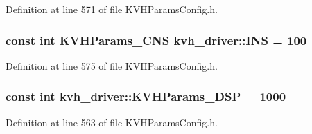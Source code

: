 \-Definition at line 571 of file \-K\-V\-H\-Params\-Config.\-h.

\subsubsection[{\-I\-N\-S}]{\setlength{\rightskip}{0pt plus 5cm}const int \-K\-V\-H\-Params\-\_\-\-C\-N\-S {\bf kvh\-\_\-driver\-::\-I\-N\-S} = 100}\label{namespacekvh__driver_a890ee9041645a980e5f8a5c93d32af52}


\-Definition at line 575 of file \-K\-V\-H\-Params\-Config.\-h.

\subsubsection[{\-K\-V\-H\-Params\-\_\-\-D\-S\-P}]{\setlength{\rightskip}{0pt plus 5cm}const int {\bf kvh\-\_\-driver\-::\-K\-V\-H\-Params\-\_\-\-D\-S\-P} = 1000}\label{namespacekvh__driver_ac5ad0c8de97fdbeae86fa7b7294479b5}


\-Definition at line 563 of file \-K\-V\-H\-Params\-Config.\-h.

